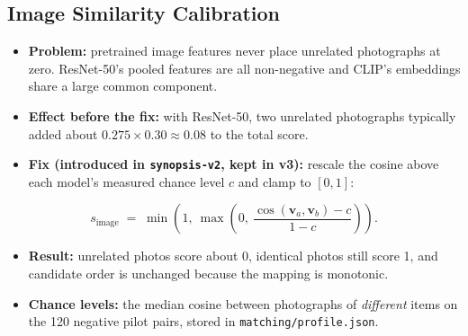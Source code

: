 \documentclass[12pt,a4paper,oneside]{report}
\newcommand{\code}[1]{\texttt{#1}}
\begin{document}
\subsection{Image Similarity Calibration}\label{sec:calib}
\begin{itemize}
  \item \textbf{Problem:} pretrained image features never place unrelated photographs at zero. ResNet-50's pooled features \cite{resnet} are all non-negative and CLIP's embeddings \cite{clip} share a large common component.
  \item \textbf{Effect before the fix:} with ResNet-50, two unrelated photographs typically added about $0.275 \times 0.30 \approx 0.08$ to the total score.
  \item \textbf{Fix (introduced in \code{synopsis-v2}, kept in v3):} rescale the cosine above each model's measured chance level $c$ and clamp to $[0,1]$:
\end{itemize}
\begin{equation}
s_{\text{image}} \;=\; \min\!\left(1,\ \max\!\left(0,\ \frac{\cos(\mathbf{v}_a,\mathbf{v}_b) - c}{1 - c}\right)\right).
\end{equation}
\begin{itemize}
  \item \textbf{Result:} unrelated photos score about 0, identical photos still score 1, and candidate order is unchanged because the mapping is monotonic.
  \item \textbf{Chance levels:} the median cosine between photographs of \emph{different} items on the 120 negative pilot pairs, stored in \code{matching/profile.json}.
\end{itemize}
\end{document}
